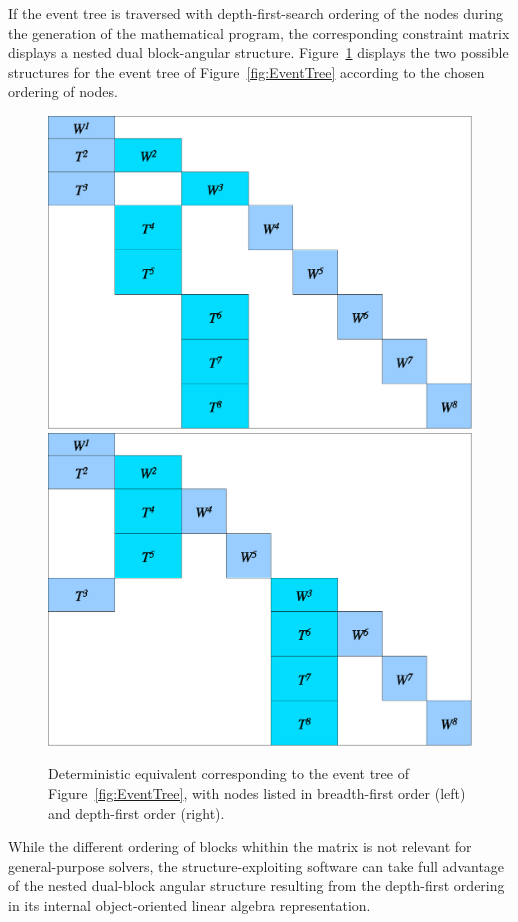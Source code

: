 If the event tree is traversed with depth-first-search ordering of the 
nodes during the generation of the mathematical program, the 
corresponding constraint matrix displays a nested dual block-angular 
structure.
Figure~\ref{fig:deteq} displays the two possible structures 
for the event tree of Figure~\ref{fig:EventTree} according 
to the chosen ordering of nodes.
%
\begin{figure}[ht]
  \centering
    \includegraphics[scale=0.37]{figures/deteq-bfs.eps} \hfill
    \includegraphics[scale=0.37]{figures/deteq-dfs.eps}
    \caption{Deterministic equivalent corresponding to the event tree 
             of Figure~\ref{fig:EventTree}, with nodes listed in breadth-first 
             order (left) and depth-first order (right).}
    \label{fig:deteq}
\end{figure}
%
While the different ordering of blocks whithin the matrix is not 
relevant for general-purpose solvers, the
structure-exploiting software \OOPS \cite{GondzioSarkissian} can take 
full advantage of the nested dual-block angular structure resulting
from the depth-first ordering in its internal object-oriented
linear algebra representation.

